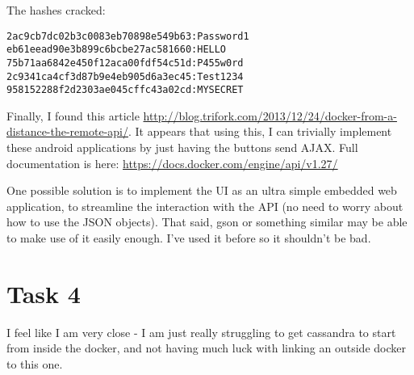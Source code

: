 \documentclass{article}
\begin{document}
The hashes cracked:
\begin{verbatim}
2ac9cb7dc02b3c0083eb70898e549b63:Password1
eb61eead90e3b899c6bcbe27ac581660:HELLO
75b71aa6842e450f12aca00fdf54c51d:P455w0rd
2c9341ca4cf3d87b9e4eb905d6a3ec45:Test1234
958152288f2d2303ae045cffc43a02cd:MYSECRET
\end{verbatim}

Finally, I found this article \url{http://blog.trifork.com/2013/12/24/docker-from-a-distance-the-remote-api/}. It appears that using this, I can trivially implement these android applications by just having the buttons send AJAX.
Full documentation is here: \url{https://docs.docker.com/engine/api/v1.27/}

One possible solution is to implement the UI as an ultra simple embedded web application, to streamline the interaction with the API (no need to worry about how to use the JSON objects).
That said, gson or something similar may be able to make use of it easily enough. I've used it before so it shouldn't be bad.

\section{Task 4}
I feel like I am very close - I am just really struggling to get cassandra to start from inside the docker, and not having much luck with linking an outside docker to this one.
\end{document}
